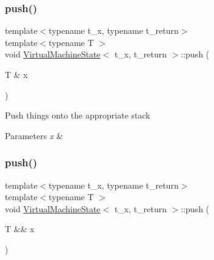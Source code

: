 \subsubsection{\texorpdfstring{push()}{push()}\hspace{0.1cm}{\footnotesize\ttfamily [1/2]}}
{\footnotesize\ttfamily template$<$typename t\+\_\+x, typename t\+\_\+return$>$ \\
template$<$typename T $>$ \\
void \hyperlink{class_virtual_machine_state}{Virtual\+Machine\+State}$<$ t\+\_\+x, t\+\_\+return $>$\+::push (\begin{DoxyParamCaption}\item[{T \&}]{x }\end{DoxyParamCaption})\hspace{0.3cm}{\ttfamily [inline]}}

Push things onto the appropriate stack 
\begin{DoxyParams}{Parameters}
{\em x} & \\
\hline
\end{DoxyParams}
\mbox{\label{class_virtual_machine_state_a38b4d61ff92f6f13ab184c5411332c2c}} 
\subsubsection{\texorpdfstring{push()}{push()}\hspace{0.1cm}{\footnotesize\ttfamily [2/2]}}
{\footnotesize\ttfamily template$<$typename t\+\_\+x, typename t\+\_\+return$>$ \\
template$<$typename T $>$ \\
void \hyperlink{class_virtual_machine_state}{Virtual\+Machine\+State}$<$ t\+\_\+x, t\+\_\+return $>$\+::push (\begin{DoxyParamCaption}\item[{T \&\&}]{x }\end{DoxyParamCaption})\hspace{0.3cm}{\ttfamily [inline]}}

\mbox{\label{class_virtual_machine_state_a40ab4e4c5ba5dd5a2940df1a6823acee}} 
